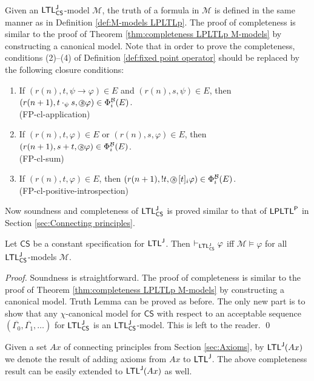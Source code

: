 \documentclass[envcountsect,envcountsame,oribibl,orivec]{llncs}
\newcommand*\circled[1]{\tikz[baseline=(char.base)]{
		\node[shape=circle,draw,inner sep=0.4pt] (char) {#1};}}
\newcommand{\limplies}{\rightarrow}
\newcommand{\sprevious}{\circled{\textit{s}}}
\newcommand{\LPLTLp}{\textsf{LPLTL}^{\sf P}}
\newcommand{\JLTL}{\textsf{LTL}^{\sf J}}
\newcommand{\jbox}[1]{\left[#1\right]\!}
\newcommand{\CS}{\textsf{CS}}
\newcommand{\agent}{i}
\newcommand{\entails}{\vDash}
\newcommand{\M}{\mathcal{M}}
\renewcommand{\phi}{\varphi}
\newcommand{\B}{\mathcal{B}}
\newcommand{\Op}[1]{\Phi^{#1}}
\newcommand{\OpB}{\Op{\B}_i}
\begin{document}
%
Given an $\JLTL_\CS$-model $\M$, the truth of a formula  in $\M$ is defined in the same manner as in Definition \ref{def:M-models LPLTLp}. The proof of completeness is similar to the proof of Theorem \ref{thm:completeness LPLTLp M-models} by constructing a canonical model. Note that in order to prove the completeness, conditions (2)--(4) of Definition \ref{def:fixed point operator} should be replaced by the following closure conditions:
%
\begin{enumerate}
	
	\item 
	If $(r(n),t,\psi \limplies \phi) \in E$ and $(r(n),s,\psi) \in E$, then $(r(n+1),t \cdot_\psi s,\sprevious \phi) \in \OpB(E)$. \\ \text{} \hfill (FP-cl-application)
	
	\item 
	If $(r(n),t,\phi) \in E$ or $(r(n),s,\phi) \in E$, then $(r(n+1),s+t,\sprevious \phi) \in \OpB(E)$. \\ \text{} \hfill (FP-cl-sum)
	
	\item 
	If $(r(n),t,\phi) \in E$, then $(r(n+1),!t,\sprevious \jbox{t}_\agent \phi) \in \OpB(E)$. \\ \text{} \hfill (FP-cl-positive-introspection)
\end{enumerate}
%
Now soundness and completeness of $\JLTL_\CS$ is proved similar to that of $\LPLTLp$ in Section \ref{sec:Connecting principles}.


\begin{theorem}
	Let $\CS$ be a constant specification for $\JLTL$. Then $\vdash_{\JLTL_\CS} \phi$ if{f} $\M\entails \phi$ for all $\JLTL_\CS$-models $\M$.
\end{theorem}
\begin{proof}
	Soundness is straightforward. The proof of completeness is similar to the proof of Theorem \ref{thm:completeness LPLTLp M-models} by constructing a canonical model.  Truth Lemma can be proved as before. The only new part is to show that any $\chi$-canonical model for $\CS$ with respect to an acceptable sequence $(\overline{\Gamma_0}, \overline{\Gamma_1}, \ldots)$ for $\JLTL_\CS$ is an $\JLTL_\CS$-model.  This is left to the reader. \qed	 
\end{proof}

Given a set $Ax$ of connecting principles from Section \ref{sec:Axioms}, by $\JLTL(Ax)$ we denote the result of adding axioms from $Ax$ to $\JLTL$. The above completeness result can  be easily extended to $\JLTL(Ax)$ as well.
\end{document}
